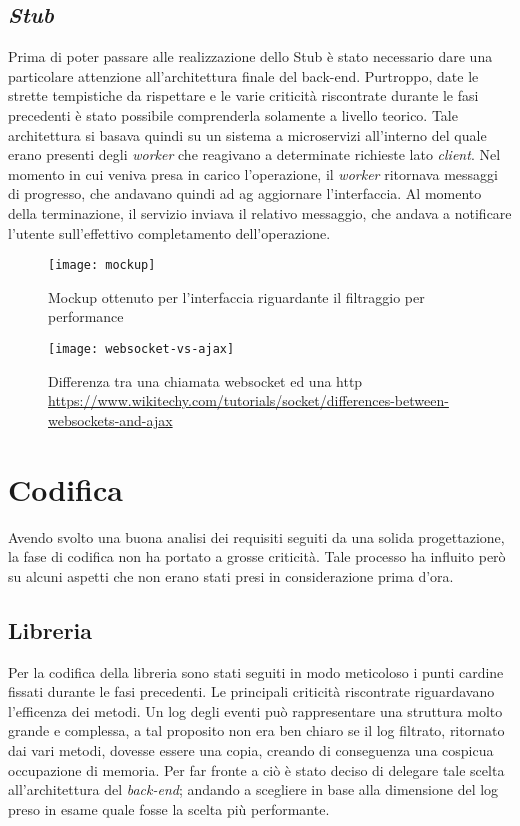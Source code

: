 \subsection{\textit{Stub}}
Prima di poter passare alle realizzazione dello Stub è stato necessario dare una particolare attenzione all'architettura finale del back-end. Purtroppo, date le strette tempistiche da rispettare e le varie criticità riscontrate durante le fasi precedenti è stato possibile comprenderla solamente a livello teorico. Tale architettura si basava quindi su un sistema a microservizi all'interno del quale erano presenti degli \textit{worker} che reagivano a determinate richieste lato \textit{client}. Nel momento in cui veniva presa in carico l'operazione, il \textit{worker} ritornava messaggi di progresso, che andavano quindi ad ag aggiornare l'interfaccia. Al momento della terminazione, il servizio inviava il relativo messaggio, che andava a notificare l'utente sull'effettivo completamento dell'operazione.\\

\begin{figure}[!h] 
	\centering 
	\texttt{[image: mockup]} 
	\caption{Mockup ottenuto per l'interfaccia riguardante il filtraggio per performance}
\end{figure}
\begin{figure}[!h] 
	\centering 
	\texttt{[image: websocket-vs-ajax]} 
	\caption{Differenza tra una chiamata websocket ed una http \url{https://www.wikitechy.com/tutorials/socket/differences-between-websockets-and-ajax}}
\end{figure}

\section{Codifica}
Avendo svolto una buona analisi dei requisiti seguiti da una solida progettazione, la  fase di codifica non ha portato a grosse criticità. Tale processo ha influito però su alcuni aspetti che non erano stati presi in considerazione prima d'ora.
\subsection{Libreria}
Per la codifica della libreria sono stati seguiti in modo meticoloso i punti cardine fissati durante le fasi precedenti. Le principali criticità riscontrate riguardavano l'efficenza dei metodi. Un log degli eventi può rappresentare una struttura molto grande e complessa, a tal proposito non era ben chiaro se il log filtrato, ritornato dai vari metodi, dovesse essere una copia, creando di conseguenza una cospicua occupazione di memoria. Per far fronte a ciò è stato deciso di delegare tale scelta all'architettura del \textit{back-end}; andando a scegliere in base alla dimensione del log preso in esame quale fosse la scelta più performante.
